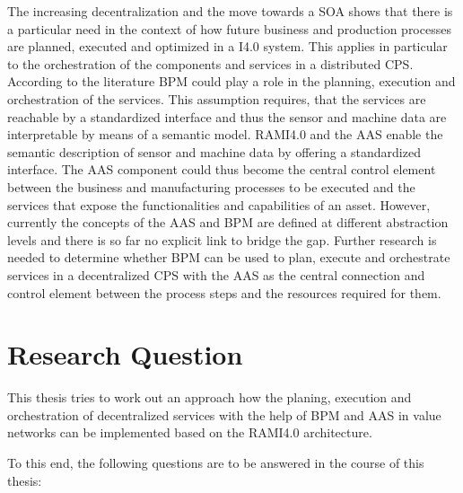 The increasing decentralization and the move towards a \ac{SOA} shows that there is a particular need in the context of how future business and production processes are planned, executed and optimized in a \ac{I4.0} system. This applies in particular to the orchestration of the components and services in a distributed \ac{CPS}. According to the literature \ac{BPM} could play a role in the planning, execution and orchestration of the services. This assumption requires, that the services are reachable by a standardized interface and thus the sensor and machine data are interpretable by means of a semantic model. \ac{RAMI4.0} and the \ac{AAS} enable the semantic description of sensor and machine data by offering a standardized interface. The \ac{AAS} component could thus become the central control element between the business and manufacturing processes to be executed and the services that expose the functionalities and capabilities of an asset. However, currently the concepts of the \ac{AAS} and \ac{BPM} are defined at different abstraction levels and there is so far no explicit link to bridge the gap. Further research is needed to determine whether BPM can be used to plan, execute and orchestrate services in a decentralized \ac{CPS} with the \ac{AAS} as the central connection and control element between the process steps and the resources required for them. 

\section{Research Question} \label{sec:research-question}
This thesis tries to work out an approach how the planing, execution and orchestration of decentralized services with the help of \ac{BPM} and \ac{AAS} in value networks can be implemented based on the \ac{RAMI4.0} architecture.

To this end, the following questions are to be answered in the course of this thesis:


